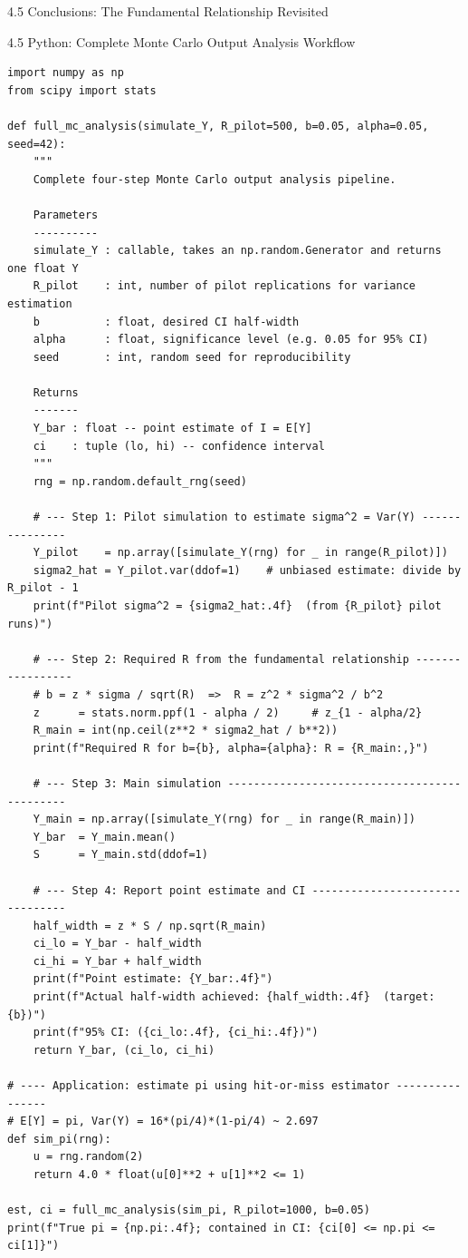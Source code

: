 \documentclass[aspectratio=169,10pt]{beamer}
\begin{document}
\begin{frame}[allowframebreaks]{4.5 Conclusions: The Fundamental Relationship Revisited}
\end{frame}

\begin{frame}[fragile]{4.5 Python: Complete Monte Carlo Output Analysis Workflow}
\begin{lstlisting}[style=python]
import numpy as np
from scipy import stats

def full_mc_analysis(simulate_Y, R_pilot=500, b=0.05, alpha=0.05, seed=42):
    """
    Complete four-step Monte Carlo output analysis pipeline.

    Parameters
    ----------
    simulate_Y : callable, takes an np.random.Generator and returns one float Y
    R_pilot    : int, number of pilot replications for variance estimation
    b          : float, desired CI half-width
    alpha      : float, significance level (e.g. 0.05 for 95% CI)
    seed       : int, random seed for reproducibility

    Returns
    -------
    Y_bar : float -- point estimate of I = E[Y]
    ci    : tuple (lo, hi) -- confidence interval
    """
    rng = np.random.default_rng(seed)

    # --- Step 1: Pilot simulation to estimate sigma^2 = Var(Y) ---------------
    Y_pilot    = np.array([simulate_Y(rng) for _ in range(R_pilot)])
    sigma2_hat = Y_pilot.var(ddof=1)    # unbiased estimate: divide by R_pilot - 1
    print(f"Pilot sigma^2 = {sigma2_hat:.4f}  (from {R_pilot} pilot runs)")

    # --- Step 2: Required R from the fundamental relationship -----------------
    # b = z * sigma / sqrt(R)  =>  R = z^2 * sigma^2 / b^2
    z      = stats.norm.ppf(1 - alpha / 2)     # z_{1 - alpha/2}
    R_main = int(np.ceil(z**2 * sigma2_hat / b**2))
    print(f"Required R for b={b}, alpha={alpha}: R = {R_main:,}")

    # --- Step 3: Main simulation ---------------------------------------------
    Y_main = np.array([simulate_Y(rng) for _ in range(R_main)])
    Y_bar  = Y_main.mean()
    S      = Y_main.std(ddof=1)

    # --- Step 4: Report point estimate and CI --------------------------------
    half_width = z * S / np.sqrt(R_main)
    ci_lo = Y_bar - half_width
    ci_hi = Y_bar + half_width
    print(f"Point estimate: {Y_bar:.4f}")
    print(f"Actual half-width achieved: {half_width:.4f}  (target: {b})")
    print(f"95% CI: ({ci_lo:.4f}, {ci_hi:.4f})")
    return Y_bar, (ci_lo, ci_hi)

# ---- Application: estimate pi using hit-or-miss estimator ----------------
# E[Y] = pi, Var(Y) = 16*(pi/4)*(1-pi/4) ~ 2.697
def sim_pi(rng):
    u = rng.random(2)
    return 4.0 * float(u[0]**2 + u[1]**2 <= 1)

est, ci = full_mc_analysis(sim_pi, R_pilot=1000, b=0.05)
print(f"True pi = {np.pi:.4f}; contained in CI: {ci[0] <= np.pi <= ci[1]}")
\end{lstlisting}
\end{frame}
\end{document}
